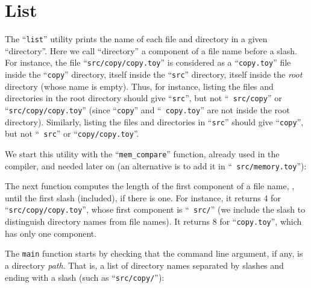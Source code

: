 \section{List}

The ``{\tt list}'' utility prints the name of each file and directory in a
given ``directory''. Here we call ``directory'' a component of a file name
before a slash. For instance, the file ``{\tt src/copy/copy.toy}'' is
considered as a ``{\tt copy.toy}'' file inside the ``{\tt copy}'' directory,
itself inside the ``{\tt src}'' directory, itself inside the {\em root}
directory (whose name is empty). Thus, for instance, listing the files and
directories in the root directory should give ``{\tt src}'', but not ``{\tt
src/copy}'' or ``{\tt src/copy/copy.toy}'' (since ``{\tt copy}'' and ``{\tt
copy.toy}'' are not inside the root directory). Similarly, listing the files
and directories in ``{\tt src}'' should give ``{\tt copy}'', but not ``{\tt
src}'' or ``{\tt copy/copy.toy}''.

We start this utility with the ``{\tt mem\_compare}'' function, already used in
the compiler, and needed later on (an alternative is to add it in ``{\tt
src/memory.toy}''):



The next function computes the length of the first component of a file name,
\ie, until the first slash (included), if there is one. For instance, it
returns 4 for ``{\tt src/copy/copy.toy}'', whose first component is ``{\tt
src/}'' (we include the slash to distinguish directory names from file names).
It returns 8 for ``{\tt copy.toy}'', which has only one component.


The {\tt main} function starts by checking that the command line argument, if
any, is a directory {\em path}. That is, a list of directory names separated by
slashes and ending with a slash (such as ``{\tt src/copy/}''):



